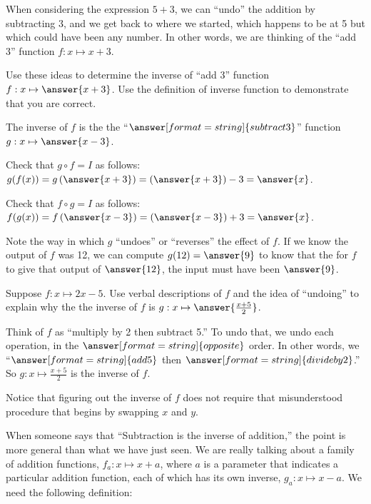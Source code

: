 \documentclass{ximera}
\begin{document}
When considering the expression $5+3$, we can ``undo'' the addition by subtracting 3, and we get back to where we started, which happens to be at 5 but which could have been any number.  In other words, we are thinking of the ``add 3'' function $f:x\mapsto x+3$.  
\begin{question}
Use these ideas to determine the inverse of ``add 3'' function $f:x\mapsto \answer{x+3}$. Use the definition of inverse function to demonstrate that you are correct.  
\begin{solution}
The inverse of $f$ is the the ``$\answer[format=string]{subtract 3}$'' function $g:x\mapsto \answer{x-3}$.  

Check that $g\circ f=I$ as follows:  $g(f(x))=g\left(\answer{x+3}\right)=\left(\answer{x+3}\right)-3=\answer{x}$.  

Check that $f\circ g = I$ as follows:  $f(g(x))=f\left(\answer{x-3}\right)=\left(\answer{x-3}\right)+3=\answer{x}$.  
\end{solution}
\end{question}

\begin{question}
Note the way in which $g$ ``undoes'' or ``reverses'' the effect of $f$.  If we know the output of $f$ was 12, we can compute $g(12)=\answer{9}$ to know that the for $f$ to give that output of $\answer{12}$, the input must have been $\answer{9}$.  
\end{question}

\begin{question}
Suppose $f:x\mapsto 2x-5$.  Use verbal descriptions of $f$ and the idea of ``undoing'' to explain why the the inverse of $f$ is $g:x\mapsto \answer{\frac{x+5}{2}}$.  
\begin{solution}
Think of $f$ as ``multiply by 2 then subtract 5.'' To undo that, we undo each operation, in the 
$\answer[format=string]{opposite}$ order.  In other words, we 
``$\answer[format=string]{add 5}$ then $\answer[format=string]{divide by 2}$.''  So $g:x\mapsto \frac{x+5}{2}$ is the inverse of $f$.  
\end{solution}
\end{question}

\begin{remark}
Notice that figuring out the inverse of $f$ does not require that misunderstood procedure that begins by swapping $x$ and $y$.  
\end{remark}

When someone says that ``Subtraction is the inverse of addition,'' the point is more general than what we have just seen.  We are really talking about a family of addition functions, $f_a:x\mapsto x+a$, where $a$ is a parameter that indicates a particular addition function, each of which has its own inverse, $g_a:x\mapsto x-a$.  We need the following definition:  
\end{document}
